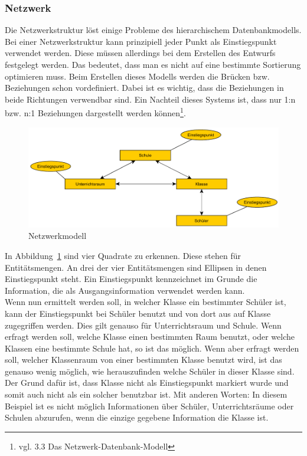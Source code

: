 \documentclass[a4paper, 12pt]{article}
\theoremstyle{plain}
\theoremstyle{definition}
\begin{document}
	\subsubsection{Netzwerk}
	\label{sec:netzdb}
	Die Netzwerkstruktur löst einige Probleme des hierarchischem Datenbankmodells. Bei einer Netzwerkstruktur kann prinzipiell jeder Punkt als Einstiegspunkt verwendet werden. Diese müssen allerdings bei dem Erstellen des Entwurfs festgelegt werden. Das bedeutet, dass man es nicht auf eine bestimmte Sortierung optimieren muss. Beim Erstellen dieses Modells werden die Brücken bzw. Beziehungen schon vordefiniert. Dabei ist es wichtig, dass die Beziehungen in beide Richtungen verwendbar sind. Ein Nachteil dieses Systems ist, dass nur 1:n bzw. n:1 Beziehungen dargestellt werden können\footnote{vgl. \cite{Jarosch2010} 3.3 Das Netzwerk-Datenbank-Modell}. 
	
\begin{figure}[h]
\includegraphics[scale=1]{netzwerkmodell.pdf}	
\caption{Netzwerkmodell}\label{fig:netzwerkModell}
\end{figure}

In Abbildung~\ref{fig:netzwerkModell} sind vier Quadrate zu erkennen. Diese stehen für Entitätsmengen. An drei der vier Entitätsmengen sind Ellipsen in denen Einstiegspunkt steht. Ein Einstiegspunkt kennzeichnet im Grunde die Information, die als Ausgangsinformation verwendet werden kann. \\
Wenn nun ermittelt werden soll, in welcher Klasse ein bestimmter Schüler ist, kann der Einstiegspunkt bei Schüler benutzt und von dort aus auf Klasse zugegriffen werden. Dies gilt genauso für Unterrichtsraum und Schule. Wenn erfragt werden soll, welche Klasse einen bestimmten Raum benutzt, oder welche Klassen eine bestimmte Schule hat, so ist das möglich. Wenn aber erfragt werden soll, welcher Klassenraum von einer bestimmten Klasse benutzt wird, ist das genauso wenig möglich, wie herauszufinden welche Schüler in dieser Klasse sind. Der Grund dafür ist, dass Klasse nicht als Einstiegspunkt markiert wurde und somit auch nicht als ein solcher benutzbar ist. Mit anderen Worten: In diesem Beispiel ist es nicht möglich Informationen über Schüler, Unterrichtsräume oder Schulen abzurufen, wenn die einzige gegebene Information die Klasse ist.
		
\end{document}
